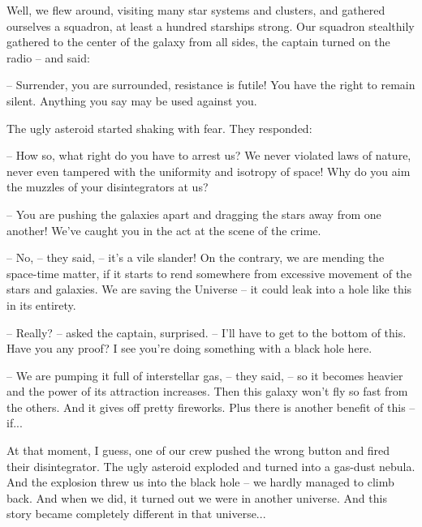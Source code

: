 \documentclass[ebook,oneside,final,openright]{memoir}
\begin{document}
Well, we flew around, visiting many star systems and clusters, and gathered ourselves a squadron, at least a hundred starships strong. Our squadron stealthily gathered to the center of the galaxy from all sides, the captain turned on the radio – and said:\par
– Surrender, you are surrounded, resistance is futile! You have the right to remain silent. Anything you say may be used against you.\par
The ugly asteroid started shaking with fear. They responded:\par
– How so, what right do you have to arrest us? We never violated laws of nature, never even tampered with the uniformity and isotropy of space! Why do you aim the muzzles of your disintegrators at us?\par
– You are pushing the galaxies apart and dragging the stars away from one another! We’ve caught you in the act at the scene of the crime.\par
– No, – they said, – it’s a vile slander! On the contrary, we are mending the space-time matter, if it starts to rend somewhere from excessive movement of the stars and galaxies. We are saving the Universe – it could leak into a hole like this in its entirety.\par
– Really? – asked the captain, surprised. – I’ll have to get to the bottom of this. Have you any proof? I see you’re doing something with a black hole here.\par
– We are pumping it full of interstellar gas, – they said, – so it becomes heavier and the power of its attraction increases. Then this galaxy won’t fly so fast from the others. And it gives off pretty fireworks. Plus there is another benefit of this – if...\par
At that moment, I guess, one of our crew pushed the wrong button and fired their disintegrator. The ugly asteroid exploded and turned into a gas-dust nebula. And the explosion threw us into the black hole – we hardly managed to climb back. And when we did, it turned out we were in another universe. And this story became completely different in that universe...
\end{document}
